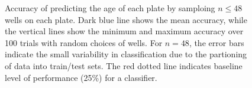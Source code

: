 \documentclass{article}
\begin{document}
\begin{figure}
  \centering
  \caption{Accuracy of predicting the age of each plate by samploing
    $n \leq 48$ wells on each plate. Dark blue line shows the mean
    accuracy, while the vertical lines show the minimum and maximum
    accuracy over 100 trials with random choices of wells.  For
    $n=48$, the error bars indicate the small variability in
    classification due to the partioning of data into train/test sets.
    The red dotted line indicates baseline level of performance (25\%)
    for a classifier.}
\end{figure}
\end{document}
